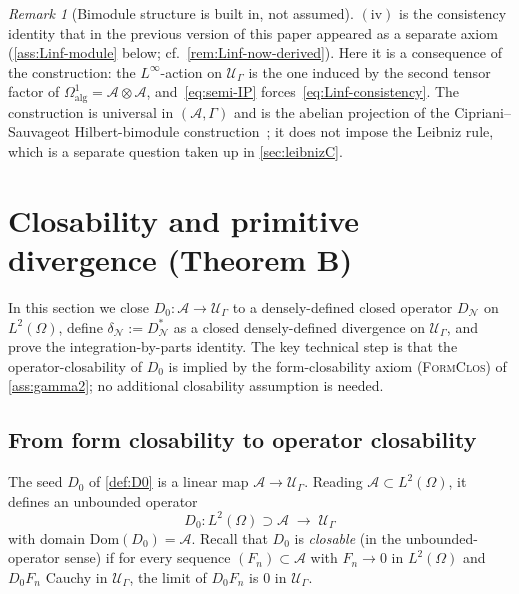 \documentclass[11pt,reqno]{amsart}
\theoremstyle{plain}
\theoremstyle{definition}
\theoremstyle{remark}
\newtheorem{remark}[theorem]{Remark}
\newcommand{\Dom}{\mathrm{Dom}}
\newcommand{\cA}{\mathcal A}
\newcommand{\cN}{\mathcal N}
\newcommand{\cU}{\mathcal U}
\newcommand{\dN}{D_{\cN}}
\newcommand{\divN}{\delta_{\cN}}
\begin{document}
\begin{remark}[Bimodule structure is built in, not assumed]\label{rem:bimodule-built-in}
$(\mathrm{iv})$ is the consistency identity that in
the previous version of this paper appeared as a separate axiom
(\cref{ass:Linf-module} below; cf.\ \cref{rem:Linf-now-derived}).
Here it is a consequence of the construction: the
$L^{\infty}$-action on $\cU_{\Gamma}$ is the one induced by the
second tensor factor of $\Omega^{1}_{\mathrm{alg}}=\cA\otimes\cA$,
and~\eqref{eq:semi-IP} forces~\eqref{eq:Linf-consistency}. The
construction is universal in $(\cA,\Gamma)$ and is the abelian
projection of the Cipriani--Sauvageot Hilbert-bimodule
construction~\cite{CiprianiSauvageot}; it does not impose the
Leibniz rule, which is a separate question taken up in
\cref{sec:leibnizC}.
\end{remark}

\section{Closability and primitive divergence (Theorem B)}\label{sec:divergenceB}

In this section we close $D_{0}\colon\cA\to\cU_{\Gamma}$ to a
densely-defined closed operator $\dN$ on $L^{2}(\Omega)$, define
$\divN:=\dN^{*}$ as a closed densely-defined divergence on
$\cU_{\Gamma}$, and prove the integration-by-parts identity.
The key technical step is that the operator-closability of
$D_{0}$ is implied by the form-closability axiom \textsc{(FormClos)}
of \cref{ass:gamma2}; no additional closability assumption is
needed.

\subsection{From form closability to operator closability}\label{sec:closability}

The seed $D_{0}$ of \cref{def:D0} is a linear map
$\cA\to\cU_{\Gamma}$. Reading $\cA\subset L^{2}(\Omega)$, it
defines an unbounded operator
\[
  D_{0}\colon L^{2}(\Omega)\supset\cA\;\to\;\cU_{\Gamma}
\]
with domain $\Dom(D_{0})=\cA$. Recall that $D_{0}$ is
\emph{closable} (in the unbounded-operator sense) if for every
sequence $(F_{n})\subset\cA$ with $F_{n}\to 0$ in $L^{2}(\Omega)$
and $D_{0}F_{n}$ Cauchy in $\cU_{\Gamma}$, the limit of
$D_{0}F_{n}$ is $0$ in $\cU_{\Gamma}$.
\end{document}
